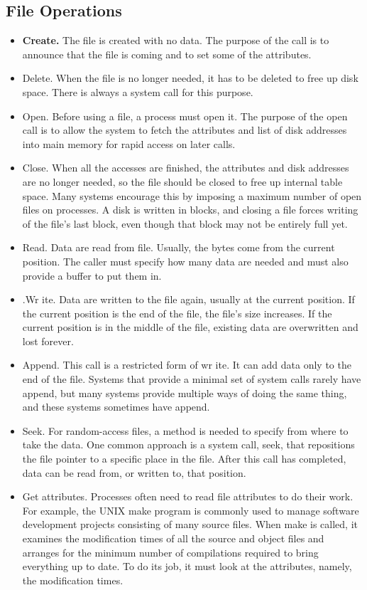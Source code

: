 \subsection{File Operations}%
\begin{itemize}
    \item \textbf{Create.} The file is created with no data. The purpose of the call is to announce that the file is coming and to set some of the attributes.
    \item Delete. When the file is no longer needed, it has to be deleted to free up disk space. There is always a system call for this purpose.
    \item Open. Before using a file, a process must open it. The purpose of the open call is to allow the system to fetch the attributes and list of disk addresses into main memory for rapid access on later calls.
    \item Close. When all the accesses are finished, the attributes and disk addresses are no longer needed, so the file should be closed to free up internal table space. Many systems encourage this by imposing a maximum number of open files on processes. A disk is written in blocks, and closing a file forces writing of the file’s last block, even though that block may not be entirely full yet.
    \item Read. Data are read from file. Usually, the bytes come from the current position. The caller must specify how many data are needed and must also provide a buffer to put them in.
    \item .Wr ite. Data are written to the file again, usually at the current position. If the current position is the end of the file, the file’s size increases. If the current position is in the middle of the file, existing data are overwritten and lost forever.
    \item Append. This call is a restricted form of wr ite. It can add data only to the end of the file. Systems that provide a minimal set of system calls rarely have append, but many systems provide multiple ways of doing the same thing, and these systems sometimes have append.
    \item Seek. For random-access files, a method is needed to specify from where to take the data. One common approach is a system call, seek, that repositions the file pointer to a specific place in the file. After this call has completed, data can be read from, or written to, that position.
    \item Get attributes. Processes often need to read file attributes to do their work. For example, the UNIX make program is commonly used to manage software development projects consisting of many source files. When make is called, it examines the modification times of all the source and object files and arranges for the minimum number of compilations required to bring everything up to date. To do its job, it must look at the attributes, namely, the modification times.

\end{itemize}
